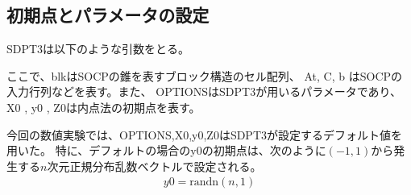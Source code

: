 \documentclass[11pt,a4paper,dvipdfmx,titlepage,uplatex]{jsarticle}
\theoremstyle{mystyle}
\newcommand{\0}{\mathbf{0}}
\begin{document}
\subsection{初期点とパラメータの設定}\label{sec:parameter_settings}

SDPT3は以下のような引数をとる。
\begin{center}
\end{center}
ここで、blkはSOCPの錐を表すブロック構造のセル配列、
At, C, b はSOCPの入力行列などを表す。また、
OPTIONSはSDPT3が用いるパラメータであり、
X0 , y0 , Z0は内点法の初期点を表す。

今回の数値実験では、OPTIONS,X0,y0,Z0はSDPT3が設定するデフォルト値を用いた。
特に、デフォルトの場合のy0の初期点は、次のように$(-1,1)$から発生する$n$次元正規分布乱数ベクトルで設定される。
\begin{align}
  y0 = \text{randn}(n,1)
\end{align}
\end{document}
